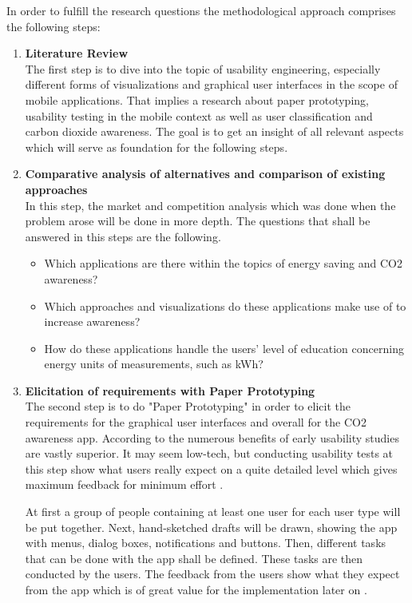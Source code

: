 \documentclass[12pt,a4paper,titlepage,oneside]{article}
\begin{document}
In order to fulfill the research questions the methodological approach comprises the following steps:
\begin{enumerate}
	\item \textbf{Literature Review} \\
	The first step is to dive into the topic of usability engineering, especially different forms of visualizations and graphical user interfaces in the scope of mobile applications. That implies a research about paper prototyping, usability testing in the mobile context as well as user classification and carbon dioxide awareness. The goal is to get an insight of all relevant aspects which will serve as foundation for the following steps.
	
	\item \textbf{Comparative analysis of alternatives and comparison of existing approaches} \\
	In this step, the market and competition analysis which was done when the problem arose will be done in more depth. The questions that shall be answered in this steps are the following.
	\begin{itemize}
		\item Which applications are there within the topics of energy saving and CO2 awareness?
		\item Which approaches and visualizations do these applications make use of to increase awareness?
		\item How do these applications handle the users' level of education concerning energy units of measurements, such as kWh?
	\end{itemize}
		
	\item \textbf{Elicitation of requirements with Paper Prototyping} \\
		The second step is to do "Paper Prototyping" in order to elicit the requirements for the graphical user interfaces and overall for the CO2 awareness app. According to \cite{lancaster2004paper} the numerous benefits of early usability studies are vastly superior. It may seem low-tech, but conducting usability tests at this step show what users really expect on a quite detailed level which gives maximum feedback for minimum effort \cite{weiss2003handheld}.
		
		At first a group of people containing at least one user for each user type will be put together.  Next, hand-sketched drafts will be drawn, showing the app with menus, dialog boxes, notifications and buttons. Then, different tasks that can be done with the app shall be defined. These tasks are then conducted by the users. The feedback from the users show what they expect from the app which is of great value for the implementation later on \cite{snyder2003paper}.
		

\end{enumerate}
\end{document}
